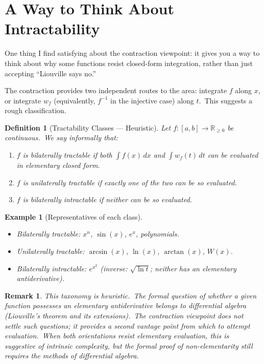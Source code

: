 \documentclass[11pt,a4paper]{article}
\newtheorem{definition}[theorem]{Definition}
\newtheorem{example}[theorem]{Example}
\newtheorem{remark}[theorem]{Remark}
\begin{document}
\section{A Way to Think About Intractability}

One thing I find satisfying about the contraction viewpoint: it gives you a way to think about why some functions resist closed-form integration, rather than just accepting ``Liouville says no.''

The contraction provides two independent routes to the area: integrate $f$ along $x$, or integrate $w_f$ (equivalently, $f^{-1}$ in the injective case) along $t$.\ This suggests a rough classification.

\begin{definition}[Tractability Classes --- Heuristic]\label{def:tractability}
Let $f:[a,b]\to\mathbb{R}_{\geq 0}$ be continuous.\ We say informally that:
\begin{enumerate}[label=(\roman*)]
\item $f$ is \emph{bilaterally tractable} if both $\int f(x)\,dx$ and $\int w_f(t)\,dt$ can be evaluated in elementary closed form.
\item $f$ is \emph{unilaterally tractable} if exactly one of the two can be so evaluated.
\item $f$ is \emph{bilaterally intractable} if neither can be so evaluated.
\end{enumerate}
\end{definition}

\begin{example}[Representatives of each class]\label{ex:tract-class}
\leavevmode
\begin{itemize}
\item \emph{Bilaterally tractable:} $x^n$, $\sin(x)$, $e^x$, polynomials.
\item \emph{Unilaterally tractable:} $\arcsin(x)$, $\ln(x)$, $\arctan(x)$, $W(x)$.
\item \emph{Bilaterally intractable:} $e^{x^2}$ (inverse: $\sqrt{\ln t}$; neither has an elementary antiderivative).
\end{itemize}
\end{example}

\begin{remark}\label{rem:heuristic}
This taxonomy is heuristic.\ The formal question of whether a given function possesses an elementary antiderivative belongs to differential algebra (Liouville's theorem and its extensions).\ The contraction viewpoint does not settle such questions; it provides a second vantage point from which to attempt evaluation.\ When both orientations resist elementary evaluation, this is suggestive of intrinsic complexity, but the formal proof of non-elementarity still requires the methods of differential algebra.
\end{remark}
\end{document}
